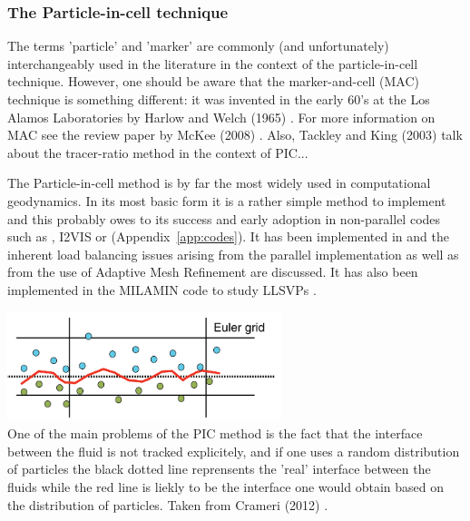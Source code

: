 \subsubsection{The Particle-in-cell technique}\label{ss:pic}

\begin{remark}
The terms 'particle' and 'marker' are commonly (and unfortunately) interchangeably used in the literature 
in the context of the particle-in-cell technique. However, one should be aware that the marker-and-cell (MAC) 
technique is something different: it was invented in the early 60's at the Los Alamos Laboratories by 
Harlow and Welch (1965) \cite{hawe65}. For more information on MAC see the review paper 
by McKee \etal (2008) \cite{mctf08}. 
Also, Tackley and King (2003) \cite{taki03} talk about the tracer-ratio method in the context of PIC... 
\end{remark}

The Particle-in-cell method is by far the most widely used in computational geodynamics. 
In its most basic form it is a rather simple method to implement and this probably owes to its success
and early adoption \cite{popo92}  in non-parallel codes such as \sopale \cite{full95}, 
I2VIS \cite{geyu03} or \citcoms \cite{mczh04} (Appendix~\ref{app:codes}).
It has been implemented in \aspect{} \cite{galh18} and the inherent load balancing issues arising from the 
parallel implementation as well as from the use of Adaptive Mesh Refinement are discussed. 
It has also been implemented in the MILAMIN code \cite{daks08} to study LLSVPs \cite{musd15}.

\begin{center}
\includegraphics[width=8cm]{images/tracking/crsg12}\\
{\captionfont One of the main problems of the PIC method is the fact that the interface 
between the fluid is not tracked explicitely, and if one uses a random distribution of 
particles the black dotted line reprensents the 'real' interface between the fluids 
while the red line is liekly to be the interface one would obtain based on the 
distribution of particles. Taken from Crameri \etal (2012) \cite{crsg12}.}
\end{center}

